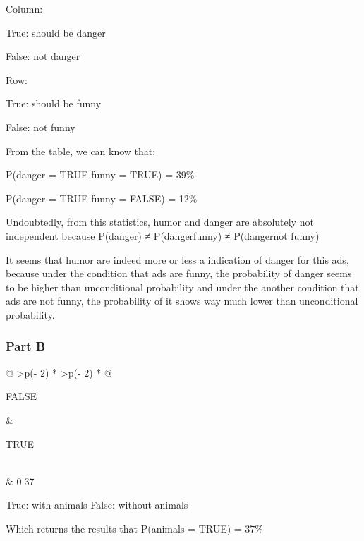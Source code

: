 \documentclass[
]{article}
\begin{document}
Column:

True: should be danger

False: not danger

Row:

True: should be funny

False: not funny

From the table, we can know that:

P(danger = TRUE \textbar{} funny = TRUE) = 39\%

P(danger = TRUE \textbar{} funny = FALSE) = 12\%

Undoubtedly, from this statistics, humor and danger are absolutely not independent because P(danger) ≠ P(danger\textbar funny) ≠ P(danger\textbar not funny)

It seems that humor are indeed more or less a indication of danger for this ads, because under the condition that ads are funny, the probability of danger seems to be higher than unconditional probability and under the another condition that ads are not funny, the probability of it shows way much lower than unconditional probability.

\hypertarget{part-b-1}{%
\subsubsection{Part B}\label{part-b-1}}

\begin{longtable}[]{@{}
  >{\centering\arraybackslash}p{(\columnwidth - 2\tabcolsep) * }
  >{\centering\arraybackslash}p{(\columnwidth - 2\tabcolsep) * }@{}}
\toprule\noalign{}
\begin{minipage}[b]{\linewidth}\centering
FALSE
\end{minipage} & \begin{minipage}[b]{\linewidth}\centering
TRUE
\end{minipage} \\
\midrule\noalign{}
\endhead
\bottomrule\noalign{}
 & 0.37 \\
\end{longtable}

True: with animals False: without animals

Which returns the results that P(animals = TRUE) = 37\%
\end{document}
